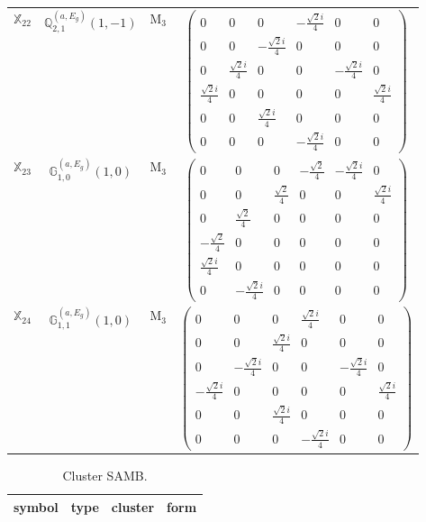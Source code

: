\documentclass[fleqn,10pt,landscape]{article}
\begin{document}
\begin{itemize}
\begin{center}
\begin{longtable}{c|c|c|c}
$ \mathbb{X}_{22} $ & $\mathbb{Q}_{2,1}^{(a,E_{g})}(1,-1)$ & M$_{3}$ & $\begin{pmatrix} 0 & 0 & 0 & - \frac{\sqrt{2} i}{4} & 0 & 0 \\ 0 & 0 & - \frac{\sqrt{2} i}{4} & 0 & 0 & 0 \\ 0 & \frac{\sqrt{2} i}{4} & 0 & 0 & - \frac{\sqrt{2} i}{4} & 0 \\ \frac{\sqrt{2} i}{4} & 0 & 0 & 0 & 0 & \frac{\sqrt{2} i}{4} \\ 0 & 0 & \frac{\sqrt{2} i}{4} & 0 & 0 & 0 \\ 0 & 0 & 0 & - \frac{\sqrt{2} i}{4} & 0 & 0 \end{pmatrix}$ \\
$ \mathbb{X}_{23} $ & $\mathbb{G}_{1,0}^{(a,E_{g})}(1,0)$ & M$_{3}$ & $\begin{pmatrix} 0 & 0 & 0 & - \frac{\sqrt{2}}{4} & - \frac{\sqrt{2} i}{4} & 0 \\ 0 & 0 & \frac{\sqrt{2}}{4} & 0 & 0 & \frac{\sqrt{2} i}{4} \\ 0 & \frac{\sqrt{2}}{4} & 0 & 0 & 0 & 0 \\ - \frac{\sqrt{2}}{4} & 0 & 0 & 0 & 0 & 0 \\ \frac{\sqrt{2} i}{4} & 0 & 0 & 0 & 0 & 0 \\ 0 & - \frac{\sqrt{2} i}{4} & 0 & 0 & 0 & 0 \end{pmatrix}$ \\
$ \mathbb{X}_{24} $ & $\mathbb{G}_{1,1}^{(a,E_{g})}(1,0)$ & M$_{3}$ & $\begin{pmatrix} 0 & 0 & 0 & \frac{\sqrt{2} i}{4} & 0 & 0 \\ 0 & 0 & \frac{\sqrt{2} i}{4} & 0 & 0 & 0 \\ 0 & - \frac{\sqrt{2} i}{4} & 0 & 0 & - \frac{\sqrt{2} i}{4} & 0 \\ - \frac{\sqrt{2} i}{4} & 0 & 0 & 0 & 0 & \frac{\sqrt{2} i}{4} \\ 0 & 0 & \frac{\sqrt{2} i}{4} & 0 & 0 & 0 \\ 0 & 0 & 0 & - \frac{\sqrt{2} i}{4} & 0 & 0 \end{pmatrix}$ \\
\end{longtable}
\end{center}
\begin{center}
\renewcommand{\arraystretch}{1.3}
\begin{longtable}{c|c|c|c}
\caption{Cluster SAMB.}
 \\
 \hline \hline
symbol & type & cluster & form \\ \hline \endfirsthead


\end{longtable}
\end{center}
\end{itemize}
\end{document}
